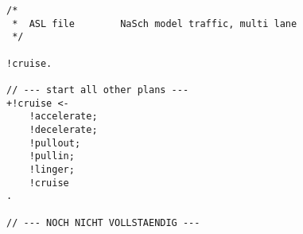 \newpage


\begin{lstlisting}[style=asl, 
                   keywords={+!cruise,+!accelerate,+!linger,+!decelerate,+!vehicle/collision}, 
                   keywords={[2]}, 
                   keywords={[3]}, 
                   caption={Agentenscript: NaSch-Modell, mehrspurig},
                   label={lst:multi-lane}]      
/*
 *  ASL file        NaSch model traffic, multi lane
 */

!cruise.

// --- start all other plans ---
+!cruise <-
    !accelerate;
    !decelerate;
    !pullout;
    !pullin;
    !linger;
    !cruise
.

// --- NOCH NICHT VOLLSTAENDIG ---
\end{lstlisting}


\newpage


